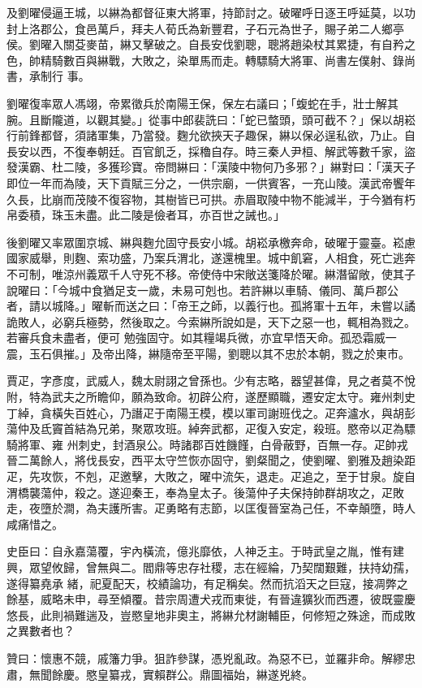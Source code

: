 \begin{pinyinscope}
 及劉曜侵逼王城，以綝為都督征東大將軍，持節討之。破曜呼日逐王呼延莫，以功封上洛郡公，食邑萬戶，拜夫人荀氏為新豐君，子石元為世子，賜子弟二人鄉亭侯。劉曜入關芟麥苗，綝又擊破之。自長安伐劉聰，聰將趙染杖其累捷，有自矜之色，帥精騎數百與綝戰，大敗之，染單馬而走。轉驃騎大將軍、尚書左僕射、錄尚書，承制行
 事。



 劉曜復率眾人馮翊，帝累徵兵於南陽王保，保左右議曰；「蝮蛇在手，壯士解其腕。且斷隴道，以觀其變。」從事中郎裴詵曰：「蛇已螫頭，頭可截不？」保以胡崧行前鋒都督，須諸軍集，乃當發。麴允欲挾天子趣保，綝以保必逞私欲，乃止。自長安以西，不復奉朝廷。百官飢乏，採穭自存。時三秦人尹桓、解武等數千家，盜發漢霸、杜二陵，多獲珍寶。帝問綝曰：「漢陵中物何乃多邪？」綝對曰：「漢天子即位一年而為陵，天下貢賦三分之，一供宗廟，一供賓客，一充山陵。漢武帝饗年久長，比崩而茂陵不復容物，其樹皆已可拱。赤眉取陵中物不能減半，于今猶有朽
 帛委積，珠玉未盡。此二陵是儉者耳，亦百世之誡也。」



 後劉曜又率眾圍京城、綝與麴允固守長安小城。胡崧承檄奔命，破曜于靈臺。崧慮國家威舉，則麴、索功盛，乃案兵渭北，遂還槐里。城中飢窘，人相食，死亡逃奔不可制，唯涼州義眾千人守死不移。帝使侍中宋敞送箋降於曜。綝潛留敞，使其子說曜曰：「今城中食猶足支一歲，未易可剋也。若許綝以車騎、儀同、萬戶郡公者，請以城降。」曜斬而送之曰：「帝王之師，以義行也。孤將軍十五年，未嘗以譎詭敗人，必窮兵極勢，然後取之。今索綝所說如是，天下之惡一也，輒相為戮之。若審兵食未盡者，便可
 勉強固守。如其糧竭兵微，亦宜早悟天命。孤恐霜威一震，玉石俱摧。」及帝出降，綝隨帝至平陽，劉聰以其不忠於本朝，戮之於東市。



 賈疋，字彥度，武威人，魏太尉詡之曾孫也。少有志略，器望甚偉，見之者莫不悅附，特為武夫之所瞻仰，願為致命。初辟公府，遂歷顯職，遷安定太守。雍州刺史丁綽，貪橫失百姓心，乃譖疋于南陽王模，模以軍司謝班伐之。疋奔瀘水，與胡彭蕩仲及氐竇首結為兄弟，聚眾攻班。綽奔武都，疋復入安定，殺班。愍帝以疋為驃騎將軍、雍
 州刺史，封酒泉公。時諸郡百姓饑饉，白骨蔽野，百無一存。疋帥戎晉二萬餘人，將伐長安，西平太守竺恢亦固守，劉粲聞之，使劉曜、劉雅及趙染距疋，先攻恢，不剋，疋邀擊，大敗之，曜中流矢，退走。疋追之，至于甘泉。旋自渭橋襲蕩仲，殺之。遂迎秦王，奉為皇太子。後蕩仲子夫保持帥群胡攻之，疋敗走，夜墮於澗，為夫護所害。疋勇略有志節，以匡復晉室為己任，不幸顛墮，時人咸痛惜之。



 史臣曰：自永嘉蕩覆，宇內橫流，億兆靡依，人神乏主。于時武皇之胤，惟有建興，眾望攸歸，曾無與二。閻鼎等忠存社稷，志在經綸，乃契闊艱難，扶持幼孺，遂得纂堯承
 緒，祀夏配天，校績論功，有足稱矣。然而抗滔天之巨寇，接凋弊之餘基，威略未申，尋至傾覆。昔宗周遭犬戎而東徙，有晉違獷狄而西遷，彼既靈慶悠長，此則禍難遄及，豈愍皇地非奧主，將綝允材謝輔臣，何修短之殊途，而成敗之異數者也？



 贊曰：懷惠不競，戚籓力爭。狙詐參謀，憑兇亂政。為惡不已，並羅非命。解繆忠肅，無聞餘慶。愍皇纂戎，實賴群公。鼎圖福始，綝遂兇終。



\end{pinyinscope}